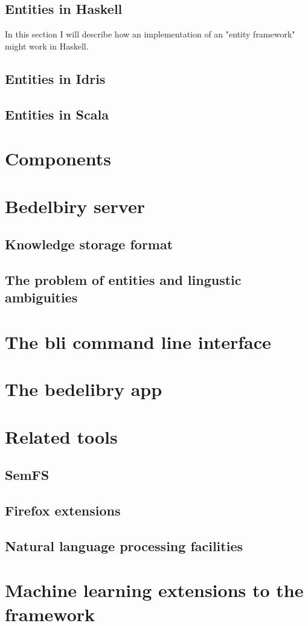 \documentclass{article}
\begin{document}
\subsection{Entities in Haskell}

In this section I will describe how an implementation of an "entity framework" might work in Haskell.



\subsection{Entities in Idris}



\subsection{Entities in Scala}



\section{Components}

\section{Bedelbiry server}
\subsection{Knowledge storage format}
\subsection{The problem of entities and lingustic ambiguities}

\section{The bli command line interface}
\section{The bedelibry app}

\section{Related tools}
\subsection{SemFS}
\subsection{Firefox extensions}
\subsection{Natural language processing facilities}

\section{Machine learning extensions to the framework}
\end{document}
